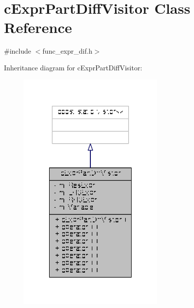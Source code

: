 \hypertarget{classcExprPartDiffVisitor}{\section{c\-Expr\-Part\-Diff\-Visitor Class Reference}
\label{classcExprPartDiffVisitor}
}


{\ttfamily \#include $<$func\-\_\-expr\-\_\-dif.\-h$>$}



Inheritance diagram for c\-Expr\-Part\-Diff\-Visitor\-:
\nopagebreak
\begin{figure}[H]
\begin{center}
\leavevmode
\includegraphics[width=204pt]{classcExprPartDiffVisitor__inherit__graph}
\end{center}
\end{figure}


